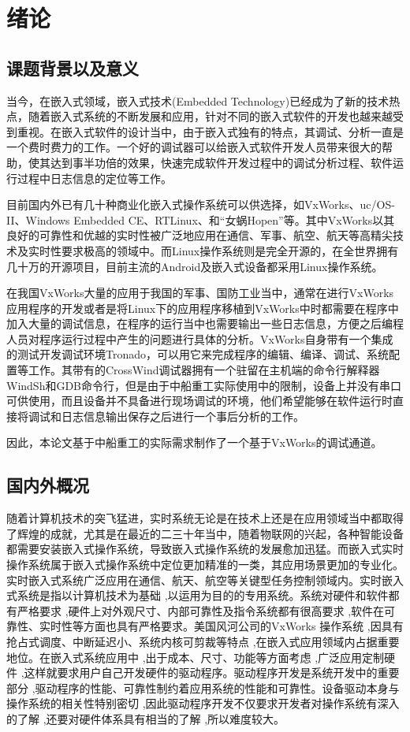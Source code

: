 \chapter{绪论}
\section{课题背景以及意义}
	当今，在嵌入式领域，嵌入式技术(Embedded Technology)已经成为了新的技术热点，随着嵌入式系统的不断发展和应用，针对不同的嵌入式软件的开发也越来越受到重视。在嵌入式软件的设计当中，由于嵌入式独有的特点，其调试、分析一直是一个费时费力的工作。一个好的调试器可以给嵌入式软件开发人员带来很大的帮助，使其达到事半功倍的效果，快速完成软件开发过程中的调试分析过程、软件运行过程中日志信息的定位等工作。
		
	目前国内外已有几十种商业化嵌入式操作系统可以供选择，如VxWorks、uc/OS-II、Windows Embedded CE、RTLinux、和“女蜗Hopen”等。其中VxWorks以其良好的可靠性和优越的实时性被广泛地应用在通信、军事、航空、航天等高精尖技术及实时性要求极高的领域中\cite{VxWorks嵌入式实时操作系统的结构研究}。而Linux操作系统则是完全开源的，在全世界拥有几十万的开源项目，目前主流的Android及嵌入式设备都采用Linux操作系统。
	
	在我国VxWorks大量的应用于我国的军事、国防工业当中，通常在进行VxWorks应用程序的开发或者是将Linux下的应用程序移植到VxWorks中时都需要在程序中加入大量的调试信息，在程序的运行当中也需要输出一些日志信息，方便之后编程人员对程序运行过程中产生的问题进行具体的分析。VxWorks自身带有一个集成的测试开发调试环境Tronado，可以用它来完成程序的编辑、编译、调试、系统配置等工作。其带有的CrossWind调试器拥有一个驻留在主机端的命令行解释器WindSh和GDB命令行，但是由于中船重工实际使用中的限制，设备上并没有串口可供使用，而且设备并不具备进行现场调试的环境，他们希望能够在软件运行时直接将调试和日志信息输出保存之后进行一个事后分析的工作。
	
	因此，本论文基于中船重工的实际需求制作了一个基于VxWorks的调试通道。
	
			
\section{国内外概况}
	随着计算机技术的突飞猛进，实时系统无论是在技术上还是在应用领域当中都取得了辉煌的成就，尤其是在最近的二三十年当中，随着物联网的兴起，各种智能设备都需要安装嵌入式操作系统，导致嵌入式操作系统的发展愈加迅猛。而嵌入式实时操作系统属于嵌入式操作系统中定位更加精准的一类，其应用场景更加的专业化。实时嵌入式系统广泛应用在通信、航天、航空等关键型任务控制领域内。实时嵌入式系统是指以计算机技术为基础 ,以运用为目的的专用系统。系统对硬件和软件都有严格要求 ,硬件上对外观尺寸、内部可靠性及指令系统都有很高要求 ,软件在可靠性、实时性等方面也具有严格要求。美国风河公司的VxWorks 操作系统 ,因具有抢占式调度、中断延迟小、系统内核可剪裁等特点 ,在嵌入式应用领域内占据重要地位。在嵌入式系统应用中 ,出于成本、尺寸、功能等方面考虑 ,广泛应用定制硬件 ,这样就要求用户自己开发硬件的驱动程序。驱动程序开发是系统开发中的重要部分 ,驱动程序的性能、可靠性制约着应用系统的性能和可靠性。设备驱动本身与操作系统的相关性特别密切 ,因此驱动程序开发不仅要求开发者对操作系统有深入的了解 ,还要对硬件体系具有相当的了解 ,所以难度较大。
	
